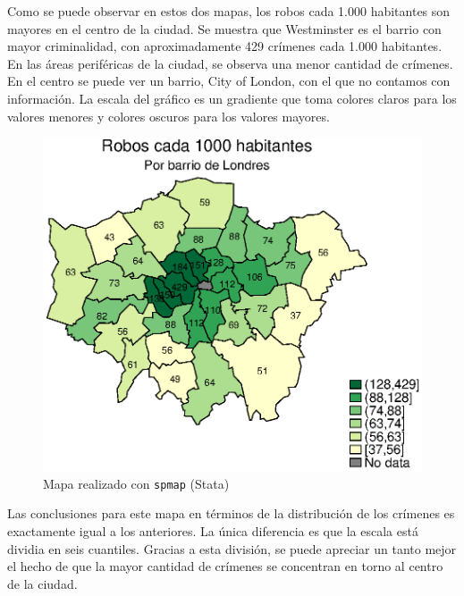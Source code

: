 \documentclass[12pt]{article}
\begin{document}
Como se puede observar en estos dos mapas, los robos cada 1.000 habitantes son mayores en el centro de la ciudad. Se muestra que Westminster es el barrio con mayor criminalidad, con aproximadamente 429 cr\'imenes cada 1.000 habitantes. En las \'areas perif\'ericas de la ciudad, se observa una menor cantidad de cr\'imenes. En el centro se puede ver un barrio, City of London, con el que no contamos con informaci\'on. La escala del gr\'afico es un gradiente que toma colores claros para los valores menores y colores oscuros para los valores mayores. 

\begin{figure}[H]
    \centering
    \includegraphics[width = \textwidth]{graficos/mapa_stata.eps}
    \caption{Mapa realizado con \texttt{spmap} (Stata)}
    \label{crimstata}
\end{figure}

Las conclusiones para este mapa en t\'erminos de la distribuci\'on de los cr\'imenes es exactamente igual a los anteriores. La \'unica diferencia es que la escala est\'a dividia en seis cuantiles. Gracias a esta divisi\'on, se puede apreciar un tanto mejor el hecho de que la mayor cantidad de cr\'imenes se concentran en torno al centro de la ciudad. 
\end{document}
